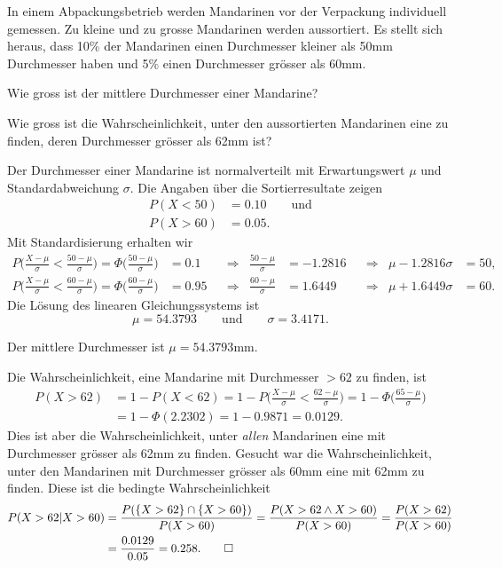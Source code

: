 In einem Abpackungsbetrieb werden Mandarinen vor der Verpackung
individuell gemessen.
Zu kleine und zu grosse Mandarinen werden aussortiert.
Es stellt sich heraus, dass 10\% der Mandarinen einen Durchmesser
kleiner als 50mm Durchmesser haben und 5\% einen Durchmesser grösser als 60mm.
\begin{teilaufgaben}
\item
Wie gross ist der mittlere Durchmesser einer Mandarine?
\item
Wie gross ist die Wahrscheinlichkeit, unter den aussortierten 
Mandarinen eine zu finden, deren Durchmesser grösser als 62mm ist?
\end{teilaufgaben}


\begin{loesung}
Der Durchmesser einer Mandarine ist normalverteilt mit Erwartungswert
$\mu$ und Standardabweichung $\sigma$.
Die Angaben über die Sortierresultate zeigen
\begin{align*}
P(X<50) &= 0.10 \qquad\text{und}\\
P(X>60) &= 0.05.
\end{align*}
Mit Standardisierung erhalten wir
\begin{align*}
P\biggl(\frac{X-\mu}{\sigma} < \frac{50-\mu}{\sigma}\biggr)
=
\Phi\biggl(\frac{50-\mu}{\sigma}\biggr)
&= 0.1
&&\Rightarrow&
\frac{50-\mu}{\sigma} 
&=
-1.2816
&&\Rightarrow&
\mu
-1.2816\sigma&=
50,
\\
P\biggl(\frac{X-\mu}{\sigma} < \frac{60-\mu}{\sigma}\biggr)
=
\Phi\biggl(\frac{60-\mu}{\sigma}\biggr)
&= 0.95
&&\Rightarrow&
\frac{60-\mu}{\sigma}
&=
1.6449
&&\Rightarrow&
\mu+1.6449\sigma
&=
60.
\end{align*}
Die Lösung des linearen Gleichungssystems ist
\[
\mu = 54.3793
\qquad\text{und}\qquad
\sigma = 3.4171.
\]
\begin{teilaufgaben}
\item
Der mittlere Durchmesser ist $\mu=54.3793\text{mm}$.
\item
Die Wahrscheinlichkeit, eine Mandarine mit Durchmesser $>62$ 
zu finden, ist
\begin{align*}
P(X>62)
&=
1-P(X<62)
=
1-P\biggl(\frac{X-\mu}{\sigma} < \frac{62-\mu}{\sigma}\biggr)
=
1-\Phi\biggl(\frac{65-\mu}{\sigma}\biggr)
\\
&=
1-\Phi(2.2302)
=
1-0.9871
=
0.0129.
\end{align*}
Dies ist aber die Wahrscheinlichkeit, unter {\em allen} Mandarinen
eine mit Durchmesser grösser als 62mm zu finden.
Gesucht war die Wahrscheinlichkeit, unter den Mandarinen mit
Durchmesser grösser als 60mm eine mit 62mm zu finden.
Diese ist die bedingte Wahrscheinlichkeit
\begin{align*}
P(X > 62 | X > 60)
&=
\frac{P(\{X>62\}\cap\{X>60\})}{P(X>60)}
=
\frac{P(X>62\wedge X>60)}{P(X>60)}
=
\frac{P(X>62)}{P(X>60)}
\\
&=
\frac{0.0129}{0.05}
=
0.258.
\qedhere
\end{align*}
\end{teilaufgaben}
\end{loesung}

